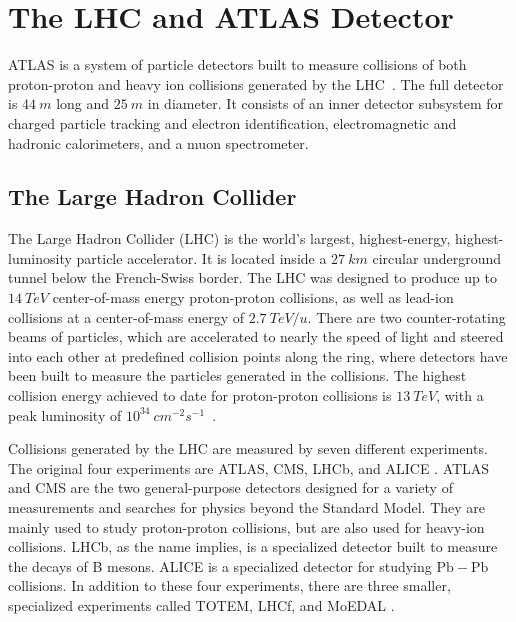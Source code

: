 \chapter{The LHC and ATLAS Detector}\label{ch:atlas}

ATLAS is a system of particle detectors built to measure collisions of both proton-proton and heavy ion collisions
generated by the LHC~\cite{atlas-detector-2008}.
The full detector is $44~m$ long and $25~m$ in diameter.
It consists of an inner detector subsystem for charged particle tracking and electron identification,
electromagnetic and hadronic calorimeters, and a muon spectrometer.

\section{The Large Hadron Collider}\label{sec:lhc}

The Large Hadron Collider (LHC) is the world's largest, highest-energy, highest-luminosity particle accelerator.
It is located inside a $27~km$ circular underground tunnel below the French-Swiss border.
The LHC was designed to produce up to $14~TeV$ center-of-mass energy proton-proton collisions,
as well as lead-ion collisions at a center-of-mass energy of $2.7~TeV/u$.
There are two counter-rotating beams of particles,
which are accelerated to nearly the speed of light and steered into each other at predefined collision points along the
ring, where detectors have been built to measure the particles generated in the collisions.
The highest collision energy achieved to date for proton-proton collisions is $13~TeV$,
with a peak luminosity of $10^{34}~cm^{-2}s^{-1}$~\cite{lhc-guide-2017}.

Collisions generated by the LHC are measured by seven different experiments.
The original four experiments are ATLAS, CMS, LHCb, and ALICE .
ATLAS and CMS are the two general-purpose detectors designed for a variety of measurements and searches for physics
beyond the Standard Model.
They are mainly used to study proton-proton collisions, but are also used for heavy-ion collisions.
LHCb, as the name implies, is a specialized detector built to measure the decays of B mesons.
ALICE is a specialized detector for studying $\mathrm{Pb}-\mathrm{Pb}$ collisions.
In addition to these four experiments, there are three smaller, specialized experiments called TOTEM, LHCf, and MoEDAL .

